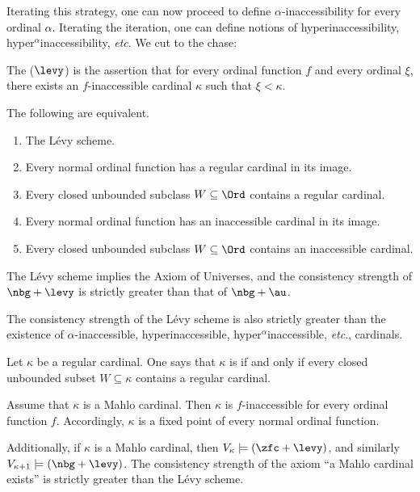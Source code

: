 Iterating this strategy,
one can now proceed to define $ \alpha $-inaccessibility
for every ordinal $ \alpha $.
Iterating the iteration,
one can define notions of
hyperinaccessibility, hyper${}^{\alpha}$inaccessibility, \emph{etc}.
We cut to the chase:

\begin{axiom}
	The  ($ \levy $) is the assertion that
	for every ordinal function $ f $ and every ordinal $ \xi $,
	there exists an $ f $-inaccessible cardinal $ \kappa $ such that $ \xi < \kappa $.
\end{axiom}

\begin{theorem}
	The following are equivalent.
	\begin{enumerate}
		\item The Lévy scheme.
		\item Every normal ordinal function
			has a regular cardinal in its image.
		\item Every closed unbounded subclass $ W \subseteq \Ord $
			contains a regular cardinal.
		\item Every normal ordinal function
			has an inaccessible cardinal in its image.
		\item Every closed unbounded subclass $ W \subseteq \Ord $
			contains an inaccessible cardinal.
	\end{enumerate}
\end{theorem}

\begin{nul}
	The Lévy scheme implies the Axiom of Universes,
	and the consistency strength of $ \nbg + \levy $ is strictly greater
	than that of $ \nbg + \au $.

	The consistency strength of the Lévy scheme is
	also strictly greater than
	the existence of $ \alpha $-inaccessible, hyperinaccessible,
	hyper${}^{\alpha}$inaccessible, \emph{etc}., cardinals.
\end{nul}

\begin{definition}
	Let $ \kappa $ be a regular cardinal.
	One says that $ \kappa $ is  if and only if
	every closed unbounded subset $ W \subseteq \kappa $
	contains a regular cardinal.
\end{definition}

\begin{nul}
	Assume that $ \kappa $ is a Mahlo cardinal.
	Then $ \kappa $ is $ f $-inaccessible for every ordinal function $ f $.
	Accordingly, $ \kappa $ is a fixed point of every normal ordinal function.

	Additionally,
	if $ \kappa $ is a Mahlo cardinal, then
	$ V_{\kappa} \models (\zfc + \levy) $, and similarly
	$ V_{\kappa + 1} \models (\nbg + \levy) $.
	The consistency strength of the axiom
	\enquote{a Mahlo cardinal exists}
	is strictly greater than the Lévy scheme.
\end{nul}

